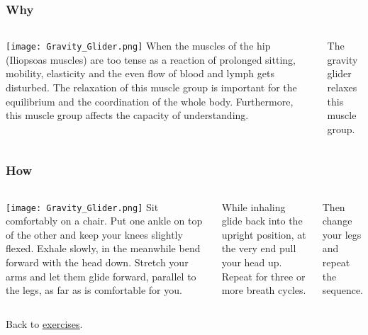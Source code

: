 

\begin{frame}
\frametitle{Why}
\begin{columns}[c] %

\texttt{[image: Gravity\_Glider.png]}
When the muscles of the hip (Iliopsoas muscles) are too tense as a reaction of prolonged sitting, mobility, elasticity and the even flow of blood and lymph gets disturbed. The relaxation of this muscle group is important for the equilibrium and the coordination of the whole body. Furthermore, this muscle group affects the capacity of understanding.

The gravity glider relaxes this muscle group.
\end{columns}
\end{frame}
\begin{frame}
\frametitle{How}
\begin{columns}[c]
\texttt{[image: Gravity\_Glider.png]}
Sit comfortably on a chair. Put one ankle on top of the other and keep your knees slightly flexed. Exhale slowly, in the meanwhile bend forward with the head down. Stretch your arms and let them glide forward, parallel to the legs, as far as is comfortable for you.

While inhaling glide back into the upright position, at the very end pull your head up. Repeat for three or more breath cycles.

Then change your legs and repeat the sequence.
\end{columns}

\vspace{1cm}
Back to \href{run:./Exercises.pdf}{\underline{exercises}}.
\end{frame}
